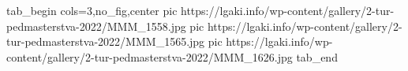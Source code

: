  
 
 
 
 


\ifcmt
  tab_begin cols=3,no_fig,center
		pic https://lgaki.info/wp-content/gallery/2-tur-pedmasterstva-2022/MMM_1558.jpg
		pic https://lgaki.info/wp-content/gallery/2-tur-pedmasterstva-2022/MMM_1565.jpg
		pic https://lgaki.info/wp-content/gallery/2-tur-pedmasterstva-2022/MMM_1626.jpg
  tab_end
\fi
